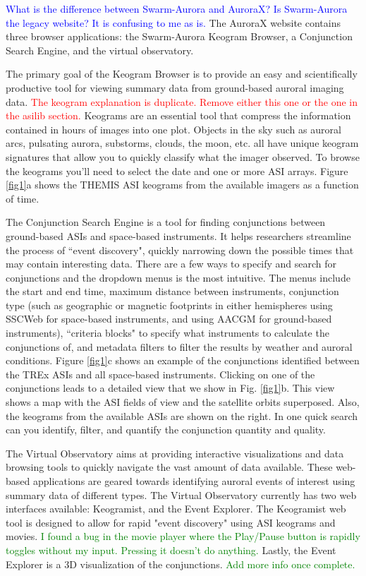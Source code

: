\documentclass[draft]{agujournal2019}
\begin{document}
\textcolor{blue}{What is the difference between Swarm-Aurora and AuroraX? Is Swarm-Aurora the legacy website? It is confusing to me as is.} The AuroraX website contains three browser applications: the Swarm-Aurora Keogram Browser, a Conjunction Search Engine, and the virtual observatory. 

The primary goal of the Keogram Browser is to provide an easy and scientifically productive tool for viewing summary data from ground-based auroral imaging data. \textcolor{red}{The keogram explanation is duplicate. Remove either this one or the one in the asilib section.} Keograms are an essential tool that compress the information contained in hours of images into one plot. Objects in the sky such as auroral arcs, pulsating aurora, substorms, clouds, the moon, etc. all have unique keogram signatures that allow you to quickly classify what the imager observed. To browse the keograms you'll need to select the date and one or more ASI arrays. Figure \ref{fig1}a shows the THEMIS ASI keograms from the available imagers as a function of time.

The Conjunction Search Engine is a tool for finding conjunctions between ground-based ASIs and space-based instruments. It helps researchers streamline the process of ``event discovery", quickly narrowing down the possible times that may contain interesting data. There are a few ways to specify and search for conjunctions and the dropdown menus is the most intuitive. The menus include the start and end time, maximum distance between instruments, conjunction type (such as geographic or magnetic footprints in either hemispheres using SSCWeb for space-based instruments, and using AACGM for ground-based instruments), ``criteria blocks" to specify what instruments to calculate the conjunctions of, and metadata filters to filter the results by weather and auroral conditions. Figure \ref{fig1}c shows an example of the conjunctions identified between the TREx ASIs and all space-based instruments. Clicking on one of the conjunctions leads to a detailed view that we show in Fig. \ref{fig1}b. This view shows a map with the ASI fields of view and the satellite orbits superposed. Also, the keograms from the available ASIs are shown on the right. In one quick search can you identify, filter, and quantify the conjunction quantity and quality.

The Virtual Observatory aims at providing interactive visualizations and data browsing tools to quickly navigate the vast amount of data available. These web-based applications are geared towards identifying auroral events of interest using summary data of different types. The Virtual Observatory currently has two web interfaces available: Keogramist, and the Event Explorer. The Keogramist web tool is designed to allow for rapid "event discovery" using ASI keograms and movies. \textcolor{green}{I found a bug in the movie player where the Play/Pause button is rapidly toggles without my input. Pressing it doesn't do anything.} Lastly, the Event Explorer is a 3D visualization of the conjunctions. \textcolor{green}{Add more info once complete.}
\end{document}
